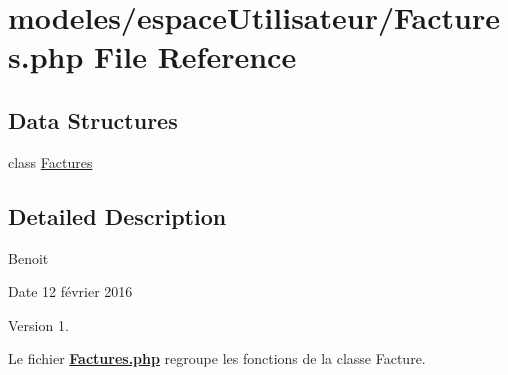 \hypertarget{_factures_8php}{}\section{modeles/espace\+Utilisateur/\+Factures.php File Reference}
\label{_factures_8php}
\subsection*{Data Structures}
\begin{DoxyCompactItemize}
\item 
class \hyperlink{class_factures}{Factures}
\end{DoxyCompactItemize}


\subsection{Detailed Description}
Benoit \begin{DoxyDate}{Date}
12 février 2016 
\end{DoxyDate}
\begin{DoxyVersion}{Version}
1.
\end{DoxyVersion}
Le fichier {\bfseries \hyperlink{_factures_8php}{Factures.\+php}} regroupe les fonctions de la classe Facture. 